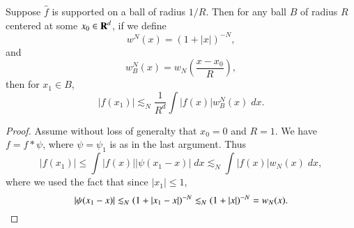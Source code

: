 \begin{lemma}
    Suppose $\widehat{f}$ is supported on a ball of radius $1/R$. Then for any ball $B$ of radius $R$ centered at some $x_0 \in \operatorname{\mathbf{R}}^d$, if we define
    \[ w^N(x) = (1 + |x|)^{-N}, \]
    and
    \[ w^N_B(x) = w_N \left( \frac{x - x_0}{R} \right), \]
    then for $x_1 \in B$,
    \[ |f(x_1)| \lesssim_N \frac{1}{R^d} \int |f(x)| w^N_B(x)\; dx. \]
\end{lemma}
\begin{proof}
    Assume without loss of generalty that $x_0 = 0$ and $R = 1$. We have $f = f * \psi$, where $\psi = \psi_1$ is as in the last argument. Thus
    \[ |f(x_1)| \leq \int |f(x)| |\psi(x_1 - x)|\; dx \lesssim_N \int |f(x)| w_N(x)\; dx, \]
    where we used the fact that since $|x_1| \leq 1$,
    \[ |\psi(x_1-x)| \lesssim_N \left( 1 + |x_1 - x| \right)^{-N} \lesssim_N (1 + |x|)^{-N} = w_N(x). \qedhere \]
\end{proof}

